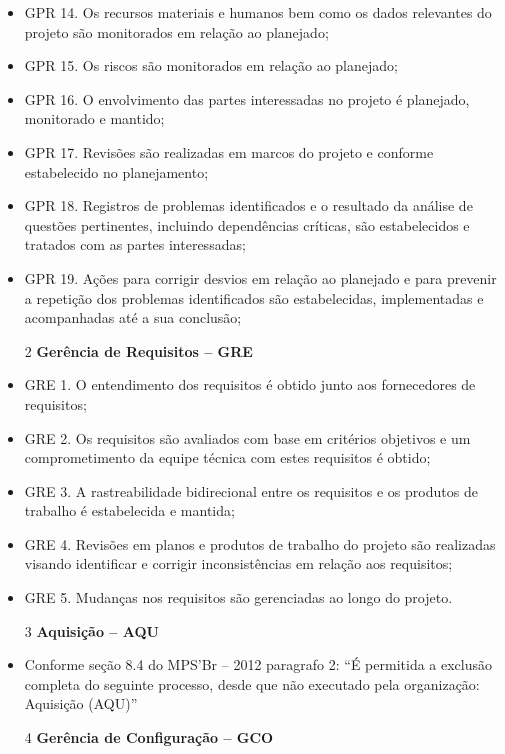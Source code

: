 \documentclass[	DIV=calc,%
							paper=a4,%
							fontsize=12pt,%
							onecolumn]{scrartcl}	 					%
\begin{document}
\begin{itemize}
\item GPR 14. Os recursos materiais e humanos bem como os dados relevantes do projeto são monitorados em relação ao planejado; 
\item GPR 15. Os riscos são monitorados em relação ao planejado; 
\item GPR 16. O envolvimento das partes interessadas no projeto é planejado, monitorado e mantido; 
\item GPR 17. Revisões são realizadas em marcos do projeto e conforme estabelecido no planejamento; 
\item GPR 18. Registros de problemas identificados e o resultado da análise de questões pertinentes, incluindo dependências críticas, são estabelecidos e tratados com as partes interessadas; 
\item GPR 19. Ações para corrigir desvios em relação ao planejado e para prevenir a repetição dos problemas identificados são estabelecidas, implementadas e acompanhadas até a sua conclusão; 

\item[2] {\textbf{Gerência de Requisitos – GRE}}

\item GRE 1. O entendimento dos requisitos é obtido junto aos fornecedores de requisitos; 
\item GRE 2. Os requisitos são avaliados com base em critérios objetivos e um comprometimento da equipe técnica com estes requisitos é obtido; 
\item GRE 3. A rastreabilidade bidirecional entre os requisitos e os produtos de trabalho é estabelecida e mantida; 
\item GRE 4. Revisões em planos e produtos de trabalho do projeto são realizadas visando identificar e corrigir inconsistências em relação aos requisitos; 
\item GRE 5. Mudanças nos requisitos são gerenciadas ao longo do projeto.


\item[3] {\textbf{Aquisição – AQU}}
\item Conforme seção 8.4 do MPS’Br – 2012 paragrafo 2: 
“É permitida a exclusão completa do seguinte processo, desde que não executado pela organização: 
Aquisição (AQU)”

\item[4] {\textbf{Gerência de Configuração – GCO}}


\end{itemize}
\end{document}
